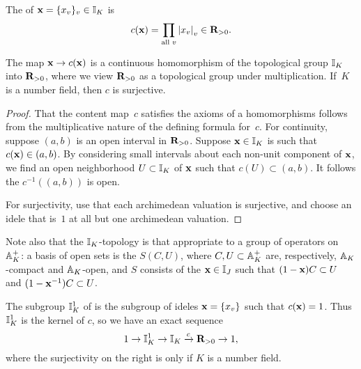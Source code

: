 \begin{definition}
The  of $\bx=\{x_v\}_v \in \II_K$ is
$$
  c(\bx) = \prod_{\text{all }v} \abs{x_v}_v \in \R_{>0}.
$$
\end{definition}

\begin{lemma}
The map $\bx\to c(\bx)$ is a continuous  homomorphism of
the topological group $\II_K$ into $\R_{>0}$, where
we view $\R_{>0}$ as a topological group under multiplication.
If~$K$ is a number field, then $c$ is surjective.
\end{lemma}
\begin{proof}
That the content map~$c$ satisfies the axioms of a homomorphisms
follows from the multiplicative nature of the defining formula
for~$c$.  For continuity, suppose $(a,b)$ is an open interval
in $\R_{>0}$.  Suppose $\bx\in\II_K$ is such that $c(\bx)\in (a,b)$.
By considering small intervals about each non-unit component of 
$\bx$, we find an open neighborhood $U\subset \II_K$ of $\bx$ 
such that $c(U)\subset (a,b)$.  It follows the $c^{-1}((a,b))$
is open.

For surjectivity, use that each archimedean valuation is surjective,
and choose an idele that is~$1$ at all but one archimedean valuation.
\end{proof}
\begin{remark}
Note also that the $\II_K$-topology is that appropriate to a
group of operators on $\AA_K^+$: a basis of open sets
is the $S(C,U)$, where $C,U\subset \AA_K^+$
are, respectively, $\AA_K$-compact and $\AA_K$-open, and
$S$ consists of the $\bx\in \II_J$ such that 
$(1-\bx) C\subset U$ and 
$(1-\bx^{-1}) C\subset U$.
\end{remark}

\begin{definition}[$1$-Ideles]
  The subgroup $\II_K^1$ of  is the subgroup of ideles
  $\bx=\{x_v\}$ such that $c(\bx)=1$.  Thus $\II_K^1$
is the kernel of $c$, so we have an exact sequence
$$
1 \to \II_K^1 \to \II_K \xra{c} \R_{>0}\to 1,
$$
where the surjectivity on the right is only if $K$
is a number field.
\end{definition}

